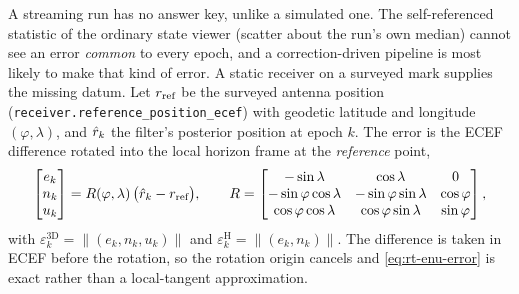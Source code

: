 \documentclass[main.tex]{subfiles}
\begin{document}
A streaming run has no answer key, unlike a simulated one.  The
self-referenced statistic of the ordinary state viewer (scatter about
the run's own median) cannot see an error \emph{common} to every epoch,
and a correction-driven pipeline is most likely to make that kind of
error.  A static receiver on a surveyed mark supplies the
missing datum.  Let
$r_{\text{ref}}$ be the surveyed antenna position
(\texttt{receiver.reference\_position\_ecef}) with geodetic latitude and
longitude $(\varphi,\lambda)$, and $\hat{r}_k$ the filter's
posterior position at epoch $k$.  The error is the ECEF difference
rotated into the local horizon frame at the \emph{reference} point,
\begin{equation}
\begin{bmatrix} e_k \\ n_k \\ u_k \end{bmatrix}
= R(\varphi,\lambda)\,
  \bigl(\hat{r}_k - r_{\text{ref}}\bigr),
\qquad
R =
\begin{bmatrix}
-\sin\lambda & \cos\lambda & 0\\
-\sin\varphi\cos\lambda & -\sin\varphi\sin\lambda & \cos\varphi\\
 \cos\varphi\cos\lambda &  \cos\varphi\sin\lambda & \sin\varphi
\end{bmatrix},
\label{eq:rt-enu-error}
\end{equation}
with $\varepsilon^{\text{3D}}_k = \lVert(e_k,n_k,u_k)\rVert$ and
$\varepsilon^{\text{H}}_k = \lVert(e_k,n_k)\rVert$.  The difference is
taken in ECEF before the rotation, so the rotation origin cancels and
\eqref{eq:rt-enu-error} is exact rather than a local-tangent
approximation.
\end{document}
